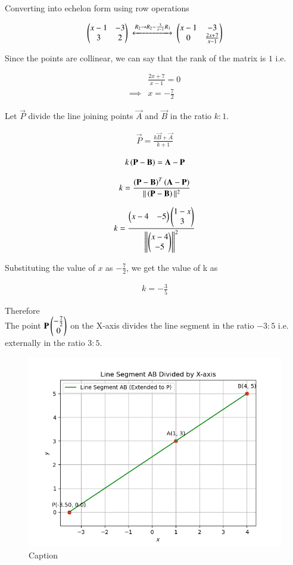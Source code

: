 \documentclass[journal]{IEEEtran}
\begin{document}
Converting into echelon form using row operations

\begin{align}
    \begin{pmatrix}x-1 & -3 \\ 3 & 2\end{pmatrix}\ \xleftrightarrow[]{R_2 \to R_2-\frac{3}{x-1}R_1} \  \begin{pmatrix}x-1 & -3 \\ 0 & \frac{2x+7}{x-1}\end{pmatrix}
\end{align}

Since the points are collinear, we can say that the rank of the matrix is $1$ i.e. 

\begin{align}
    &\frac{2x+7}{x-1} = 0\\
    \implies& x=-\frac{7}{2}
\end{align}

Let $\vec{P}$ divide the line joining points $\vec{A}$ and $\vec{B}$ in the ratio $k:1$. 

\begin{align}
    \vec{P}=\frac{k\vec{B}+\vec{A}}{k+1}
\end{align}

\begin{align}
    k\left(\mathbf{P}- \mathbf{B}\right) = \mathbf{A}-\mathbf{P}
\end{align}

\begin{align}
    k=\frac{\left(\mathbf{P}-\mathbf{B}\right)^T\left(\mathbf{A}-\mathbf{P}\right)}{||\left(\mathbf{P}-\mathbf{B}\right)||^2}
\end{align}

\begin{align}
      k=\frac{\begin{pmatrix}x-4 & -5\end{pmatrix}\begin{pmatrix}1-x\\3\end{pmatrix}}{{\left\lVert\begin{pmatrix}x-4 \\ -5\end{pmatrix}\right\rVert}^2}
\end{align}

Substituting the value of $x$ as $-\frac{7}{2}$, we get the value of k as

\begin{align}
    k=-\frac{3}{5}
\end{align}

Therefore\\

The point $\mathbf{P}\begin{pmatrix}-\frac{7}{2}\\0\end{pmatrix}$ on the X-axis divides the line segment in the ratio $-3:5$ i.e. externally in the ratio $3:5$.

\begin{figure}
    \centering
    \includegraphics[width=0.8\columnwidth]{Figs/plot(py).png}
    \caption{Caption}
    \label{fig:placeholder}
\end{figure}
\end{document}
